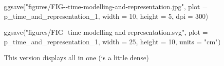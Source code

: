 \documentclass[
  letterpaper,
  DIV=11,
  numbers=noendperiod]{scrartcl}
\newenvironment{Shaded}{\begin{snugshade}}{\end{snugshade}}
\newcommand{\AttributeTok}[1]{\textcolor[rgb]{0.40,0.45,0.13}{#1}}
\newcommand{\DecValTok}[1]{\textcolor[rgb]{0.68,0.00,0.00}{#1}}
\newcommand{\FunctionTok}[1]{\textcolor[rgb]{0.28,0.35,0.67}{#1}}
\newcommand{\NormalTok}[1]{\textcolor[rgb]{0.00,0.23,0.31}{#1}}
\newcommand{\StringTok}[1]{\textcolor[rgb]{0.13,0.47,0.30}{#1}}
\begin{document}
\begin{Shaded}
\begin{Highlighting}[]
\FunctionTok{ggsave}\NormalTok{(}\StringTok{"figures/FIG{-}{-}time{-}modelling{-}and{-}representation.jpg"}\NormalTok{, }
       \AttributeTok{plot =}\NormalTok{ p\_time\_and\_representation\_1,}
       \AttributeTok{width =} \DecValTok{10}\NormalTok{, }\AttributeTok{height =} \DecValTok{5}\NormalTok{, }
       \AttributeTok{dpi =} \DecValTok{300}\NormalTok{)}

\FunctionTok{ggsave}\NormalTok{(}\StringTok{"figures/FIG{-}{-}time{-}modelling{-}and{-}representation.svg"}\NormalTok{, }
       \AttributeTok{plot =}\NormalTok{ p\_time\_and\_representation\_1,}
       \AttributeTok{width =} \DecValTok{25}\NormalTok{, }\AttributeTok{height =} \DecValTok{10}\NormalTok{, }\AttributeTok{units =} \StringTok{"cm"}\NormalTok{)}
\end{Highlighting}
\end{Shaded}

This version displays all in one (is a little dense)
\end{document}
